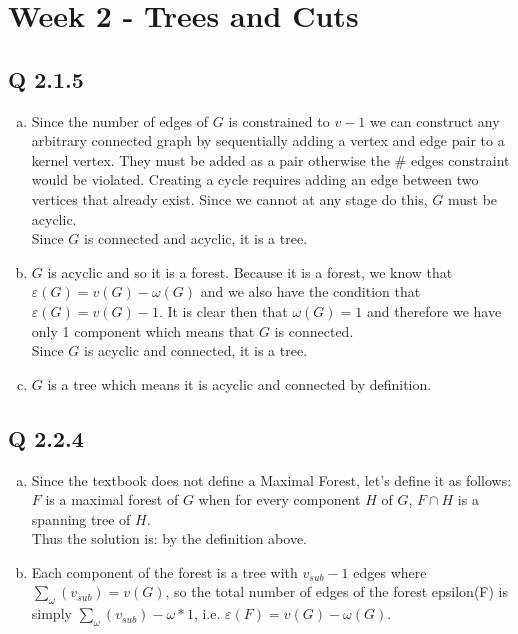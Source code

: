 
\chapter[Week 2 - Trees and Cuts]{Week 2 - Trees and Cuts}

\section{Q 2.1.5}
\begin{enumerate}[(a)]
\item Since the number of edges of $G$ is constrained to $v-1$ we can construct any arbitrary connected graph by sequentially adding a vertex and edge pair to a kernel vertex. They must be added as a pair otherwise the \# edges constraint would be violated. Creating a cycle requires adding an edge between two vertices that already exist. Since we cannot at any stage do this, $G$ must be acyclic.\\
Since $G$ is connected and acyclic, it is a tree.

\item $G$ is acyclic and so it is a forest. Because it is a forest, we know that $\varepsilon(G) = v(G) - \omega(G)$ and we also have the condition that $\varepsilon(G) = v(G) - 1$. It is clear then that $\omega(G) = 1$ and therefore we have only 1 component which means that $G$ is connected.\\
Since $G$ is acyclic and connected, it is a tree.

\item $G$ is a tree which means it is acyclic and connected by definition.
\end{enumerate}


\section{Q 2.2.4}
\begin{enumerate}[(a)]
\item Since the textbook does not define a Maximal Forest, let's define it as follows:\\
$F$ is a maximal forest of $G$ when for every component $H$ of $G$, $F \cap H$ is a spanning tree of $H$.\\
Thus the solution is: by the definition above.

\item Each component of the forest is a tree with $v_{sub}-1$ edges where $\sum_{\omega}(v_{sub}) = v(G)$, so the total number of edges of the forest epsilon(F) is simply $\sum_{\omega}(v_{sub}) - \omega* 1$, i.e. $\varepsilon(F) = v(G) - \omega(G)$.
\end{enumerate}

